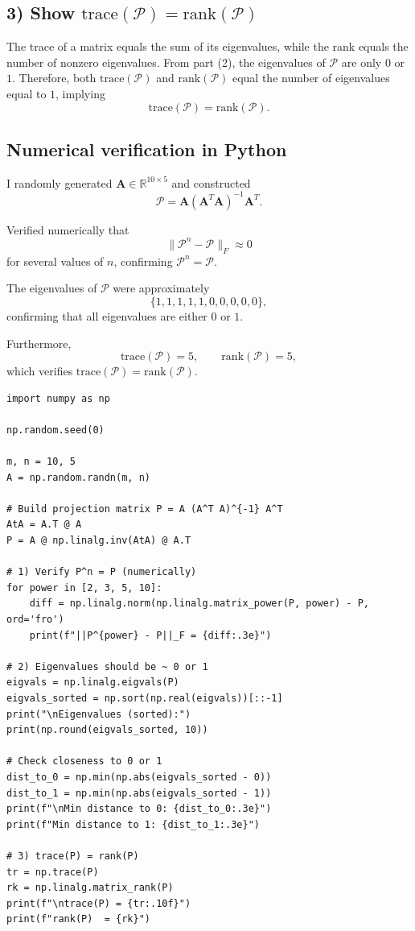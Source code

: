 \documentclass[11pt]{article}
\newcommand{\mtx}[1]{\mathbf{#1}}
\def \mA {\mtx{A}}
\begin{document}
\subsection*{3) Show $\mathrm{trace}(\mathcal{P})=\mathrm{rank}(\mathcal{P})$}

The trace of a matrix equals the sum of its eigenvalues, while the rank equals the number of nonzero eigenvalues.
From part (2), the eigenvalues of $\mathcal P$ are only $0$ or $1$.
Therefore, both $\mathrm{trace}(\mathcal P)$ and $\mathrm{rank}(\mathcal P)$ equal the number of eigenvalues equal to $1$, implying
\[
\mathrm{trace}(\mathcal P)=\mathrm{rank}(\mathcal P).
\]

\subsection*{Numerical verification in Python}

I randomly generated $\mA\in\mathbb{R}^{10\times5}$ and constructed
\[
\mathcal P=\mA(\mA^T\mA)^{-1}\mA^T.
\]

Verified numerically that
\[
\|\mathcal P^n-\mathcal P\|_F\approx 0
\]
for several values of $n$, confirming $\mathcal P^n=\mathcal P$.

The eigenvalues of $\mathcal P$ were approximately
\[
\{1,1,1,1,1,0,0,0,0,0\},
\]
confirming that all eigenvalues are either $0$ or $1$.

Furthermore,
\[
\mathrm{trace}(\mathcal P)=5,\qquad \mathrm{rank}(\mathcal P)=5,
\]
which verifies $\mathrm{trace}(\mathcal P)=\mathrm{rank}(\mathcal P)$.

\begin{lstlisting}
import numpy as np

np.random.seed(0)

m, n = 10, 5
A = np.random.randn(m, n)

# Build projection matrix P = A (A^T A)^{-1} A^T
AtA = A.T @ A
P = A @ np.linalg.inv(AtA) @ A.T

# 1) Verify P^n = P (numerically)
for power in [2, 3, 5, 10]:
    diff = np.linalg.norm(np.linalg.matrix_power(P, power) - P, ord='fro')
    print(f"||P^{power} - P||_F = {diff:.3e}")

# 2) Eigenvalues should be ~ 0 or 1
eigvals = np.linalg.eigvals(P)
eigvals_sorted = np.sort(np.real(eigvals))[::-1]
print("\nEigenvalues (sorted):")
print(np.round(eigvals_sorted, 10))

# Check closeness to 0 or 1
dist_to_0 = np.min(np.abs(eigvals_sorted - 0))
dist_to_1 = np.min(np.abs(eigvals_sorted - 1))
print(f"\nMin distance to 0: {dist_to_0:.3e}")
print(f"Min distance to 1: {dist_to_1:.3e}")

# 3) trace(P) = rank(P)
tr = np.trace(P)
rk = np.linalg.matrix_rank(P)
print(f"\ntrace(P) = {tr:.10f}")
print(f"rank(P)  = {rk}")
\end{lstlisting}
\end{document}
